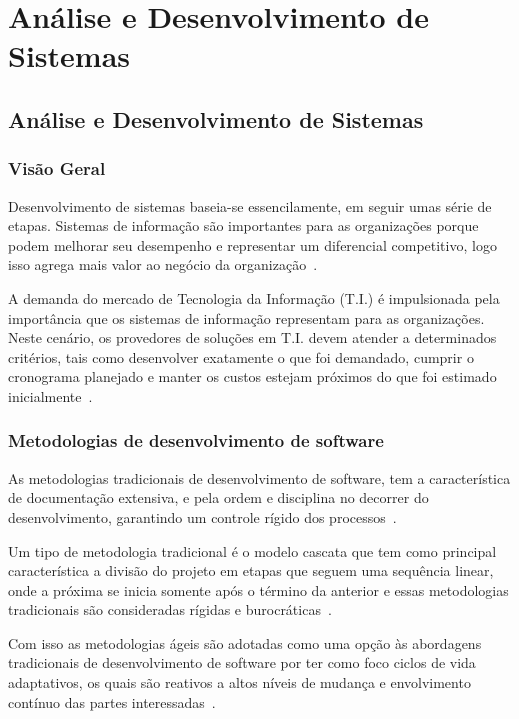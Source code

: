\part{Análise e Desenvolvimento de Sistemas}\label{ParteII}

\chapter[Análise e Desenvolvimento de Sistemas]{Análise e Desenvolvimento de Sistemas}\label{Capitulo3}

\section{Visão Geral}

Desenvolvimento de sistemas baseia-se essencilamente, em seguir umas série de etapas.
Sistemas de informação são importantes para as organizações porque podem melhorar seu desempenho e representar um diferencial competitivo, logo isso agrega mais valor ao negócio da organização~\cite{alvarenga2016efeitos}.

A demanda do mercado de Tecnologia da Informação (T.I.) é impulsionada pela importância que os sistemas de informação representam para as organizações.
Neste cenário, os provedores de soluções em T.I. devem atender a determinados critérios, tais como desenvolver exatamente o que foi demandado, cumprir o cronograma planejado e manter os custos estejam próximos do que foi estimado inicialmente~\cite{alvarenga2016efeitos}.

\section{Metodologias de desenvolvimento de software}

As metodologias tradicionais de desenvolvimento de software, tem a característica de documentação extensiva, e pela ordem e disciplina no decorrer do desenvolvimento, garantindo um controle rígido dos processos~\cite{baltzan2016tecnologia}.

Um tipo de metodologia tradicional é o modelo cascata que tem como principal característica a divisão do projeto em etapas que seguem uma sequência linear, onde a próxima se inicia somente após o término da anterior e essas metodologias tradicionais são consideradas rígidas e burocráticas~\cite{baltzan2016tecnologia}.

Com isso as metodologias ágeis são adotadas como uma opção às abordagens tradicionais de desenvolvimento de software por ter como foco ciclos de vida adaptativos, os quais são reativos a altos níveis de mudança e envolvimento contínuo das partes interessadas~\cite{vargas2014manual}.

